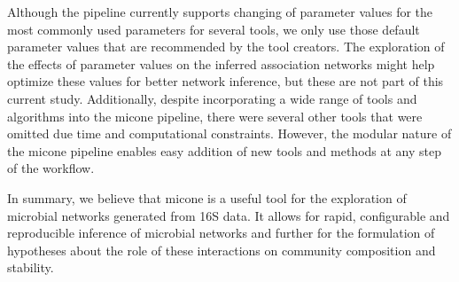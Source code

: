   Although the pipeline currently supports changing of parameter values for the most commonly used parameters for several tools, we only use those default parameter values that are recommended by the tool creators.
  The exploration of the effects of parameter values on the inferred association networks might help optimize these values for better network inference, but these are not part of this current study.
  Additionally, despite incorporating a wide range of tools and algorithms into the \ac{micone} pipeline, there were several other tools that were omitted due time and computational constraints.
  However, the modular nature of the \ac{micone} pipeline enables easy addition of new tools and methods at any step of the workflow.


  In summary, we believe that \ac{micone} is a useful tool for the exploration of microbial networks generated from 16S data.
  It allows for rapid, configurable and reproducible inference of microbial networks and further for the formulation of hypotheses about the role of these interactions on community composition and stability.
